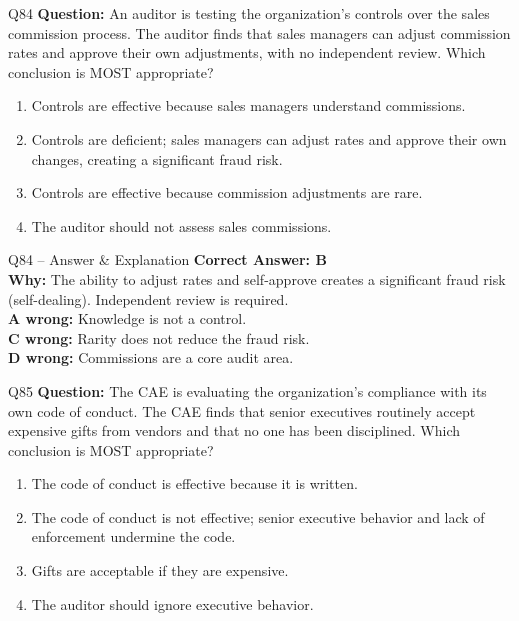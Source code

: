 \documentclass[aspectratio=169,10pt]{beamer}
\begin{document}
	\begin{frame}[t]{Q84}
		\small
		\textbf{Question:} An auditor is testing the organization's controls over the sales commission process. The auditor finds that sales managers can adjust commission rates and approve their own adjustments, with no independent review. Which conclusion is MOST appropriate?
		\begin{enumerate}[label=\Alph*.,itemsep=1pt,topsep=2pt]
			\item Controls are effective because sales managers understand commissions.
			\item Controls are deficient; sales managers can adjust rates and approve their own changes, creating a significant fraud risk.
			\item Controls are effective because commission adjustments are rare.
			\item The auditor should not assess sales commissions.
		\end{enumerate}
	\end{frame}
	
	\begin{frame}[t]{Q84 -- Answer \& Explanation}
		\small
		\textbf{Correct Answer: B} \\[4pt]
		\textbf{Why:} The ability to adjust rates and self-approve creates a significant fraud risk (self-dealing). Independent review is required. \\[4pt]
		\textbf{A wrong:} Knowledge is not a control. \\[2pt]
		\textbf{C wrong:} Rarity does not reduce the fraud risk. \\[2pt]
		\textbf{D wrong:} Commissions are a core audit area.
	\end{frame}
	
	\begin{frame}[t]{Q85}
		\small
		\textbf{Question:} The CAE is evaluating the organization's compliance with its own code of conduct. The CAE finds that senior executives routinely accept expensive gifts from vendors and that no one has been disciplined. Which conclusion is MOST appropriate?
		\begin{enumerate}[label=\Alph*.,itemsep=1pt,topsep=2pt]
			\item The code of conduct is effective because it is written.
			\item The code of conduct is not effective; senior executive behavior and lack of enforcement undermine the code.
			\item Gifts are acceptable if they are expensive.
			\item The auditor should ignore executive behavior.
		\end{enumerate}
	\end{frame}
	
\end{document}
